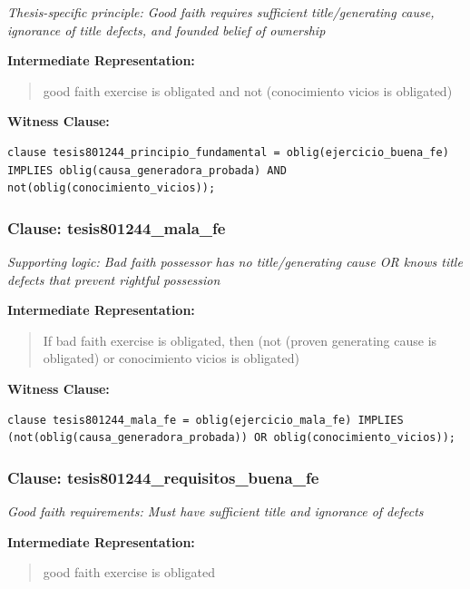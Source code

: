 \documentclass[11pt,a4paper]{article}
\begin{document}
\textit{Thesis-specific principle: Good faith requires sufficient title/generating cause, ignorance of title defects, and founded belief of ownership}

\textbf{Intermediate Representation:}

\begin{quote}
good faith exercise is obligated and not (conocimiento vicios is obligated)
\end{quote}

\textbf{Witness Clause:}

\begin{lstlisting}[style=witnessstyle, language=Witness]
clause tesis801244_principio_fundamental = oblig(ejercicio_buena_fe) IMPLIES oblig(causa_generadora_probada) AND not(oblig(conocimiento_vicios));
\end{lstlisting}

\subsubsection{Clause: tesis801244\_mala\_fe}

\textit{Supporting logic: Bad faith possessor has no title/generating cause OR knows title defects that prevent rightful possession}

\textbf{Intermediate Representation:}

\begin{quote}
If bad faith exercise is obligated, then (not (proven generating cause is obligated) or conocimiento vicios is obligated)
\end{quote}

\textbf{Witness Clause:}

\begin{lstlisting}[style=witnessstyle, language=Witness]
clause tesis801244_mala_fe = oblig(ejercicio_mala_fe) IMPLIES (not(oblig(causa_generadora_probada)) OR oblig(conocimiento_vicios));
\end{lstlisting}

\subsubsection{Clause: tesis801244\_requisitos\_buena\_fe}

\textit{Good faith requirements: Must have sufficient title and ignorance of defects}

\textbf{Intermediate Representation:}

\begin{quote}
good faith exercise is obligated
\end{quote}
\end{document}
